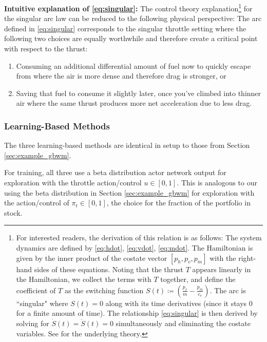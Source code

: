 \documentclass[mnsc,sglanonrev]{informs4}
\begin{document}
\begin{description}
\textbf{Intuitive explanation of \eqref{eq:singular}:} The control theory explanation\footnote{For interested readers, the derivation of this relation is as follows: The system dynamics are defined by \eqref{eq:hdot}, \eqref{eq:vdot}, \eqref{eq:mdot}. The Hamiltonian is given by the inner product of the costate vector $[p_h, p_v, p_m]$ with the right-hand sides of these equations. Noting that the thrust $T$ appears linearly in the Hamiltonian, we collect the terms with $T$ together, and define the coefficient of $T$ as the switching function $S(t)\coloneq \left(\frac{p_v}{m}-\frac{p_m}{c_e}\right)$. The arc is ``singular" where $S(t)=0$ along with its time derivatives (since it stays 0 for a finite amount of time). The relationship \eqref{eq:singular} is then derived by solving for $\dot{S}(t)=\ddot{S}(t)=0$ simultaneously and eliminating the costate variables. See \cite{pontryagin1987mathematical} for the underlying theory.}
    for the singular arc law can be reduced to the following physical perspective: The arc defined in \eqref{eq:singular} corresponds to the singular throttle setting where the following two choices are equally worthwhile and therefore create a critical point with respect to the thrust:
    \begin{enumerate}
        \item Consuming an additional differential amount of fuel now to quickly escape from where the air is more dense and therefore drag is stronger, or
        \item Saving that fuel to consume it slightly later, once you've climbed into thinner air where the same thrust produces more net acceleration due to less drag.
      \end{enumerate}

\end{description}


\subsubsection{Learning-Based Methods}
\label{sec:god_rl}

The three learning-based methods are identical in setup to those from Section \ref{sec:example_gbwm}.

For training, all three use a beta distribution actor network output for exploration with the throttle action/control $u\in[0,1]$. This is analogous to our using the beta distribution in Section \ref{sec:example_gbwm} for exploration with the action/control of $\pi_t\in[0,1]$, the choice for the fraction of the portfolio in stock. 
\end{document}
